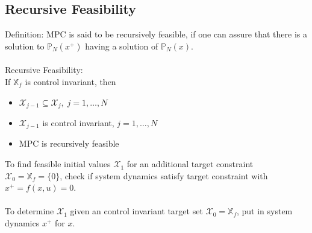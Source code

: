 \documentclass[english]{latex4ei/latex4ei_sheet}
\begin{document}
\begin{sectionbox}
\subsection{Recursive Feasibility}
Definition: MPC is said to be recursively feasible, if one can assure that there is a solution to $\mathbb{P}_N(x^{+})$ having a solution of $\mathbb{P}_N(x)$.\\
\\
Recursive Feasibility:\\
If $\mathbb{X}_f$ is control invariant, then
\begin{itemize}
    \item $\mathcal{X}_{j-1}\subseteq\mathcal{X}_{j},\;j=1,\ldots,N$
    \item $\mathcal{X}_{j-1}$ is control invariant, $j=1,\ldots,N$
    \item MPC is recursively feasible
\end{itemize}
\vspace{0.2cm}
To find feasible initial values $\mathcal{X}_1$ for an additional target constraint $\mathcal{X}_0=\mathbb{X}_f=\{0\}$, check if system dynamics satisfy target constraint with $x^{+}=f(x,u)=0$.\\
\\
To determine $\mathcal{X}_1$ given an control invariant target set $\mathcal{X}_0=\mathbb{X}_f$, put in system dynamics $x^{+}$ for $x$.

\end{sectionbox}

\newpage
\end{document}
